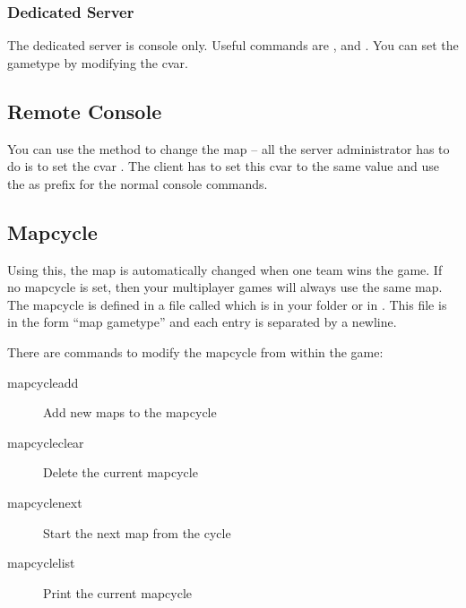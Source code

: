 \subsubsection{Dedicated Server}
The dedicated server is console only. Useful commands are ,  and . You can set the gametype by modifying the  cvar.

\subsection{Remote Console}
You can use the  method to change the map -- all the server administrator has to do is to set the cvar . The client has to set this cvar to the same value and use the  as prefix for the normal console commands.

\subsection{Mapcycle}
Using this, the map is automatically changed when one team wins the game. If no mapcycle is set, then your multiplayer games will always use the same map. The mapcycle is defined in a file called  which is in your  folder or in . This file is in the form ``map gametype'' and each entry is separated by a newline.

There are commands to modify the mapcycle from within the game:
\begin{description}
\item[mapcycleadd] Add new maps to the mapcycle
\item[mapcycleclear] Delete the current mapcycle
\item[mapcyclenext] Start the next map from the cycle
\item[mapcyclelist] Print the current mapcycle
\end{description}
